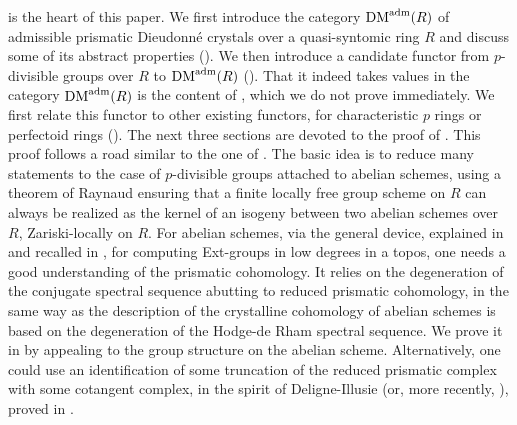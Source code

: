 \documentclass{amsart}
\theoremstyle{plain}
\theoremstyle{definition}
\newcommand{\DM}{\mathrm{DM}}
\newcommand{\red}[1]{{\color{black} #1}}
\begin{document}
 is the heart of this paper. We first introduce the category \red{$\DM^{\rm adm}(R)$ of admissible} prismatic Dieudonn\'e crystals over a quasi-syntomic ring $R$ and discuss some of its abstract properties (). We then introduce a candidate functor from $p$-divisible groups over $R$ to \red{$\DM^{\rm adm}(R)$} (). That it indeed takes values in the category \red{$\DM^{\rm adm}(R)$} is the content of , which we do not prove immediately. We first relate this functor to other existing functors, for characteristic $p$ rings or perfectoid rings (). The next three sections are devoted to the proof of . This proof follows a road similar to the one of \cite[Ch. 2, 3]{berthelot_breen_messing_theorie_de_dieudonne_cristalline_II}. The basic idea is to reduce many statements to the case of $p$-divisible groups attached to abelian schemes, using a theorem of Raynaud ensuring that a finite locally free group scheme on $R$ can always be realized as the kernel of an isogeny between two abelian schemes over $R$, Zariski-locally on $R$. For abelian schemes, via the general device, explained in \cite[Ch. 2]{berthelot_breen_messing_theorie_de_dieudonne_cristalline_II} and recalled in , for computing Ext-groups in low degrees in a topos, one needs a good understanding of the prismatic cohomology. It relies on the degeneration of the conjugate spectral sequence abutting to reduced prismatic cohomology, in the same way as the description of the crystalline cohomology of abelian schemes is based on the degeneration of the Hodge-de Rham spectral sequence. We prove it in  by appealing to the \red{group structure on the abelian scheme. Alternatively, one could use an} identification of some truncation of the reduced prismatic complex with some cotangent complex, in the spirit of Deligne-Illusie (or, more recently, \cite{bhatt_morrow_scholze_integral_p_adic_hodge_theory}), proved in .   
\end{document}
